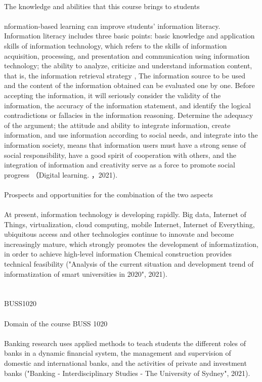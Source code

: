 \documentclass{article}
\begin{document}
	\\
	The knowledge and abilities that this course brings to students \\
	\\
	nformation-based learning can improve students' information literacy. Information literacy includes three basic points: basic knowledge and application skills of information technology, which refers to the skills of information acquisition, processing, and presentation and communication using information technology; the ability to analyze, criticize and understand information content, that is, the information retrieval strategy , The information source to be used and the content of the information obtained can be evaluated one by one. Before accepting the information, it will seriously consider the validity of the information, the accuracy of the information statement, and identify the logical contradictions or fallacies in the information reasoning. Determine the adequacy of the argument; the attitude and ability to integrate information, create information, and use information according to social needs, and integrate into the information society, means that information users must have a strong sense of social responsibility, have a good spirit of cooperation with others, and the integration of information and creativity serve as a force to promote social progress （Digital learning. ，2021). \\
	\\
	Prospects and opportunities for the combination of the two aspects \\
	\\
	At present, information technology is developing rapidly. Big data, Internet of Things, virtualization, cloud computing, mobile Internet, Internet of Everything, ubiquitous access and other technologies continue to innovate and become increasingly mature, which strongly promotes the development of informatization, in order to achieve high-level information Chemical construction provides technical feasibility ("Analysis of the current situation and development trend of informatization of smart universities in 2020", 2021). \\
	\\
	\\
	BUSS1020 \\
	\\
	Domain of the course BUSS 1020 \\
	\\
	Banking research uses applied methods to teach students the different roles of banks in a dynamic financial system, the management and supervision of domestic and international banks, and the activities of private and investment banks ("Banking - Interdisciplinary Studies - The University of Sydney", 2021). \\
\end{document}
